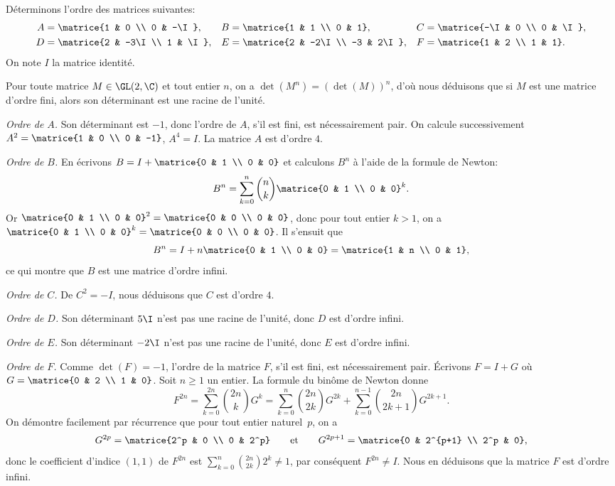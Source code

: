 Déterminons l'ordre des matrices suivantes:
%
\begin{align*}
  A &= \matrice{1 & 0 \\ 0 & -\I}, & B &= \matrice{1 & 1 \\ 0 & 1}, & C &= \matrice{-\I & 0 \\ 0 & \I}, \\
  D &= \matrice{2 & -3\I \\ 1 & \I}, & E &= \matrice{2 & -2\I \\ -3 & 2\I}, & F &=\matrice{1 & 2 \\ 1 & 1}.
\end{align*}
%
On note $I$ la matrice identité.

Pour toute matrice $M\in\GL(2,\C)$ et tout entier $n$, on a $\det(M^n) = (\det(M))^n$, d'où nous déduisons que si $M$ est une matrice d'ordre fini, alors son déterminant est une racine de l'unité.

\emph{Ordre de $A$.}
Son déterminant est $-1$, donc l'ordre de $A$, s'il est fini, est nécessairement pair.
On calcule successivement $A^2 = \matrice{1 & 0 \\ 0 & -1}$, $A^4 = I$.
La matrice $A$ est d'ordre $4$.
  
\emph{Ordre de $B$.}
En écrivons $B = I + \matrice{0 & 1 \\ 0 & 0}$ et calculons $B^n$ à l'aide de la formule de Newton:
\[
  B^n = \sum_{k = 0}^n \binom{n}{k} \matrice{0 & 1 \\ 0 & 0}^k.
\]
Or $\matrice{0 & 1 \\ 0 & 0}^2 = \matrice{0 & 0 \\ 0 & 0}$, donc pour tout entier $k>1$, on a $\matrice{0 & 1 \\ 0 & 0}^k = \matrice{0 & 0 \\ 0 & 0}$.
Il s'ensuit que
\[
  B^n = I + n\matrice{0 & 1 \\ 0 & 0} = \matrice{1 & n \\ 0 & 1},
\]
ce qui montre que $B$ est une matrice d'ordre infini.

\emph{Ordre de $C$.}
De $C^2 = -I$, nous déduisons que $C$ est d'ordre $4$.

\emph{Ordre de $D$.}
Son déterminant $5\I$ n'est pas une racine de l'unité, donc $D$ est d'ordre infini.

\emph{Ordre de $E$.}
Son déterminant $-2\I$ n'est pas une racine de l'unité, donc $E$ est d'ordre infini.

\emph{Ordre de $F$.}
Comme $\det(F) = -1$, l'ordre de la matrice $F$, s'il est fini, est nécessairement pair.
Écrivons $F = I + G$ où $G = \matrice{0 & 2 \\ 1 & 0}$. 
Soit $n\geq 1$ un entier.
La formule du binôme de Newton donne
%
\[
  F^{2n}
    = \sum_{k=0}^{2n} \binom{2n}{k} G^k
    = \sum_{k=0}^n \binom{2n}{2k} G^{2k} + \sum_{k=0}^{n-1} \binom{2n}{2k+1} G^{2k+1}.
\]
On démontre facilement par récurrence que pour tout entier naturel~$p$, on a
\[
  G^{2p} = \matrice{2^p & 0 \\ 0 & 2^p}
  \qquad\text{et}\qquad
  G^{2p+1} = \matrice{0 & 2^{p+1} \\ 2^p & 0},
\]
donc le coefficient d'indice $(1,1)$ de $F^{2n}$ est $\sum_{k=0}^n \binom{2n}{2k} 2^k \neq 1$, par conséquent $F^{2n} \neq I$.
Nous en déduisons que la matrice $F$ est d'ordre infini.
